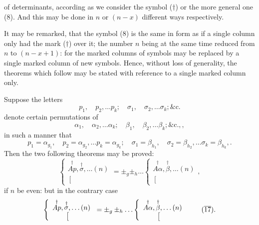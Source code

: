 \documentclass[11pt,a4paper]{article}
\theoremstyle{plain}
\theoremstyle{definition}
\theoremstyle{remark}
\begin{document}
of determinants, according as we consider the symbol ($\dagger$) or the more general one (8).
And this may be done in $n$ or $(n-x)$ different ways respectively.

It may be remarked, that the symbol (8) is the same in form as if a single
column only had the mark ($\dagger$) over it; the number $n$ being at the same time
reduced from $n$ to $(n-x+1)$: for the marked columns of symbols may be replaced
by a single marked column of new symbols. Hence, without loss of generality, the
theorems which follow may be stated with reference to a single marked column only.

Suppose the letters
\[
p_1, \quad p_2, \ldots p_k; \quad \sigma_1, \quad \sigma_2, \ldots \sigma_k; \&\text{c.}
\tag{14}
\]
denote certain permutations of
\[
\alpha_1, \quad \alpha_2, \ldots \alpha_k; \quad \beta_1, \quad \beta_2, \ldots \beta_k; \&\text{c.},
\tag{15},
\]
in such a manner that
\[
p_1 = \alpha_{g_1}, \quad p_2 = \alpha_{g_2}, \ldots p_k = \alpha_{g_k}; \quad
\sigma_1 = \beta_{h_1}, \quad \sigma_2 = \beta_{h_2}, \ldots \sigma_k = \beta_{h_k},
\tag{16}.
\]
Then the two following theorems may be proved:
\[
\left\{\begin{array}{c}
\stackrel{\dagger}{Ap}, \stackrel{\dagger}{\sigma}, \ldots (n) \\
\left[\begin{array}{c}
\\
\end{array}\right.
\end{array}\right.
= \pm_g \pm_h \ldots
\left\{\begin{array}{c}
\stackrel{\dagger}{A\alpha}, \stackrel{\dagger}{\beta}, \ldots (n) \\
\left[\begin{array}{c}
\\
\end{array}\right.
\end{array}\right.
\tag{17},
\]
if $n$ be even: but in the contrary case
\[
\left\{\begin{array}{c}
\stackrel{\dagger}{Ap}, \stackrel{\dagger}{\sigma}, \ldots (n) \\
\left[\begin{array}{c}
\\
\end{array}\right.
\end{array}\right.
= \pm_g \pm_h \ldots
\left\{\begin{array}{c}
\stackrel{\dagger}{A\alpha}, \stackrel{\dagger}{\beta}, \ldots (n) \\
\left[\begin{array}{c}
\\
\end{array}\right.
\end{array}\right.
\tag{$\overline{17}$}.
\]
\end{document}
